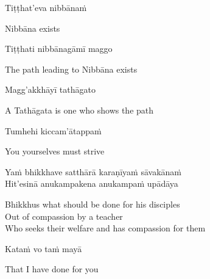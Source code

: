 \suttaRef{[Dhp 212]}

\begin{verses}
  Tiṭṭhat'eva nibbānaṁ
\end{verses}

\begin{english}
  Nibbāna exists
\end{english}

\begin{verses}
  Tiṭṭhati nibbānagāmī maggo
\end{verses}

\begin{english}
  The path leading to Nibbāna exists
\end{english}

\begin{verses}
  Magg'akkhāyī tathāgato
\end{verses}

\begin{english}
  A Tathāgata is one who shows the path
\end{english}

\suttaRef{[MN 107]}

\begin{verses}
  Tumhehi kiccam'ātappaṁ
\end{verses}

\begin{english}
  You yourselves must strive
\end{english}

\suttaRef{[Dhp 276]}

\begin{verses}
  Yaṁ bhikkhave satthārā karaṇīyaṁ sāvakānaṁ\\
  Hit'esinā anukampakena anukampaṁ upādāya
\end{verses}

\begin{english-verses}
  Bhikkhus what should be done for his disciples\\
  Out of compassion by a teacher\\
  Who seeks their welfare and has compassion for them
\end{english-verses}

\begin{verses}
  Kataṁ vo taṁ mayā
\end{verses}

\begin{english}
  That I have done for you
\end{english}

